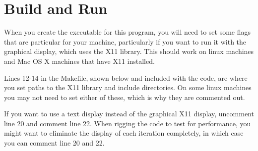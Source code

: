 \documentclass[letterpaper,10pt,openany,oneside]{sphinxmanual}
\begin{document}
\chapter{Build and Run}
\label{7.1-BuildAndRun/build::doc}\label{7.1-BuildAndRun/build:build-and-run}
When you create the executable for this program, you will need to set some flags that are particular for your machine, particularly if you want to run it with the graphical display, which uses the X11 library.  This should work on linux machines and Mac OS X machines that have X11 installed.

Lines 12-14 in the Makefile, shown below and included with the code, are where you set paths to the X11 library and include directories.  On some linux machines you may not need to set either of these, which is why they are commented out.

If you want to use a text display instead of the graphical X11 display, uncomment line 20 and comment line 22.  When rigging the code to test for performance, you might want to eliminate the display of each iteration completely, in which case you can comment line 20 and 22.
\end{document}
